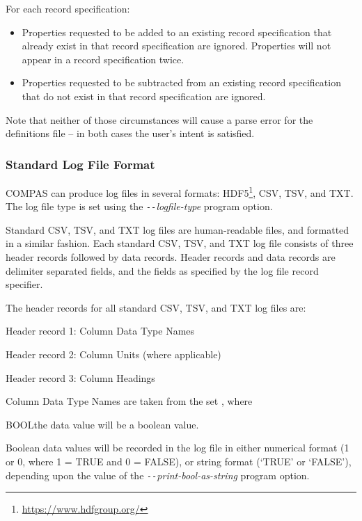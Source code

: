 \newpage
For each record specification:

\begin{itemize}
\item  Properties requested to be added to an existing record specification that already exist in that record specification are ignored.  Properties will not appear in a record specification twice.
\item  Properties requested to be subtracted from an existing record specification that do not exist in that record specification are ignored.
\end{itemize}

Note that neither of those circumstances will cause a parse error for the definitions file -- in both cases the user's intent is satisfied.

\newpage
\subsubsection{Standard Log File Format}\label{sec:StandardLogFileFormat}

COMPAS can produce log files in several formats: \ac{HDF5}\footnote{\url{https://www.hdfgroup.org/}}, \ac{CSV}, \ac{TSV}, and \ac{TXT}. The log file type is set using the \textit{\texttt{-{}-}logfile-type} program option.

Standard \ac{CSV}, \ac{TSV}, and \ac{TXT} log files are human-readable files, and formatted in a similar fashion. Each standard \ac{CSV}, \ac{TSV}, and \ac{TXT} log file consists of three header records followed by data records.  Header records and data records are delimiter separated fields, and the fields as specified by the log file record specifier.

The header records for all standard \ac{CSV}, \ac{TSV}, and \ac{TXT} log files are:

\tabto{3em}Header record 1: Column Data Type Names\par
\tabto{3em}Header record 2: Column Units (where applicable)\par
\tabto{3em}Header record 3: Column Headings


\bigskip
Column Data Type Names are taken from the set , where

\tabto{3em}BOOL\tabto{7.5em}the data value will be a boolean value.

\hfill
\begin{minipage}{\dimexpr\textwidth-7.5em}
Boolean data values will be recorded in the log file in either numerical format (1 or 0, where 1 = TRUE and  0 = FALSE), or string format (`TRUE' or `FALSE'), depending upon the value of the \textit{\texttt{-{}-}print-bool-as-string} program option.
\end{minipage}

